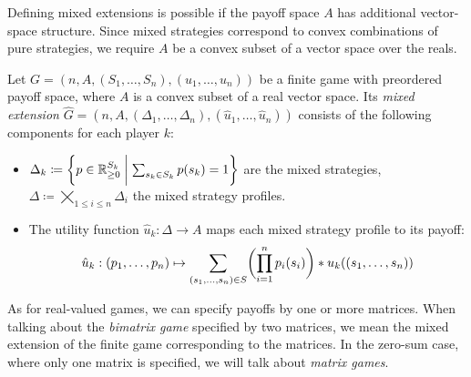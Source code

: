 \documentclass[a4paper]{scrreprt}
\newcommand{\Rp}{\mathbb{R}_{\geq 0}}
\newcommand{\B}{\mathcal{B}}
\begin{document}
    Defining mixed extensions is possible if the payoff space $A$ has additional vector-space structure. Since mixed strategies correspond to convex combinations of pure strategies, we require $A$ be a convex subset of a vector space over the reals.
    \begin{defn}
        Let $G = (n, A, (S_1, \dots, S_n), (u_1, \dots, u_n))$ be a finite game with preordered payoff space,
        where $A$ is a convex subset of a real vector space.
        Its \emph{mixed extension} $\hat{G} = (n, A, (\Delta_1, \dots, \Delta_n), (\hat{u}_1, \dots, \hat{u}_n))$ consists of the following components for each player $k$:
        \begin{itemize} %
            \item $\Delta_k \coloneqq \biggset{ p \in \Rp^{S_k} \biggmid \sum_{s_k \in S_k} p(s_k) = 1 } $ are the mixed strategies, $\Delta \coloneqq \bigtimes\limits_{1\leq i \leq n} \Delta_i$ the mixed strategy profiles.
            
            \item
            The utility function $\hat{u}_k: \Delta \to A$ maps each mixed strategy profile to
            its payoff:
            \begin{gather}
            \hat{u}_k: 
            (p_1, \dots, p_n) 
            \mapsto
            \sum_{(s_1, \dots, s_n) \in S} \biggl(\prod_{i=1}^{n} p_i(s_i)\biggr) * u_k( (s_1, \dots, s_n) )
            \label{eq:preorderedPayoffSpaceMixedStrategyUtility}
            \end{gather}
        \end{itemize}
    \end{defn}
    As for real-valued games, we can specify payoffs by one or more matrices.
    When talking about the \emph{bimatrix game} specified by two matrices, we mean the mixed extension of the finite game corresponding to the matrices.
    In the zero-sum case, where only one matrix is specified, we will talk about \emph{matrix games}.
    
\end{document}
